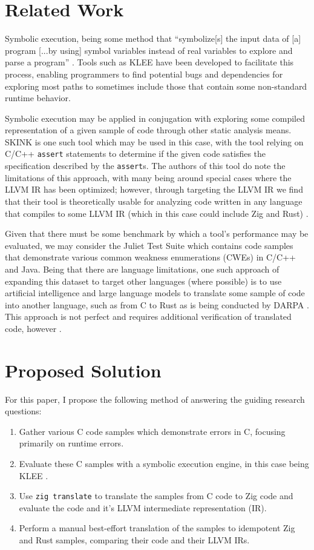 \documentclass[conference]{IEEEtran}
\begin{document}
\section{Related Work}
Symbolic execution, being some method that ``symbolize[s] the input data of
[a] program [...by using] symbol variables instead of real variables to
explore and parse a program'' \cite{zhang2020survey}. Tools such as KLEE
\cite{cadar2021klee} have been developed to facilitate this process,
enabling programmers to find potential bugs and dependencies for exploring
most paths to sometimes include those that contain some non-standard runtime
behavior.

Symbolic execution may be applied in conjugation with exploring some compiled
representation of a given sample of code through other static analysis means.
SKINK \cite{cassez2017skink} is one such tool which may be used in this case,
with the tool relying on C/C++ \texttt{assert} statements to determine if the
given code satisfies the specification described by the \texttt{assert}s. The
authors of this tool do note the limitations of this approach, with many
being around special cases where the LLVM IR has been optimized; however,
through targeting the LLVM IR we find that their tool is theoretically
usable for analyzing code written in any language that compiles to some LLVM
IR (which in this case could include Zig and Rust) \cite{cassez2017skink}.

Given that there must be some benchmark by which a tool's performance may
be evaluated, we may consider the Juliet Test Suite \cite{boland2012juliet}
which contains code samples that demonstrate various common weakness
enumerations (CWEs) in C/C++ and Java. Being that there are language
limitations, one such approach of expanding this dataset to target other
languages (where possible) is to use artificial intelligence and large
language models to translate some sample of code into another language, such
as from C to Rust as is being conducted by DARPA \cite{emre2021translating}.
This approach is not perfect and requires additional verification of
translated code, however \cite{fulton2025how}.


\section{Proposed Solution}
For this paper, I propose the following method of answering the guiding research
questions:
\begin{enumerate}
    \item Gather various C code samples which demonstrate errors in C, focusing
        primarily on runtime errors.
    \item Evaluate these C samples with a symbolic execution engine, in this case
        being KLEE \cite{cadar2021klee}.
    \item Use \texttt{zig translate} to translate the samples from C code to Zig
        code and evaluate the code and it's LLVM intermediate representation (IR).
    \item Perform a manual best-effort translation of the samples to idempotent
        Zig and Rust samples, comparing their code and their LLVM IRs.
\end{enumerate}
\end{document}

